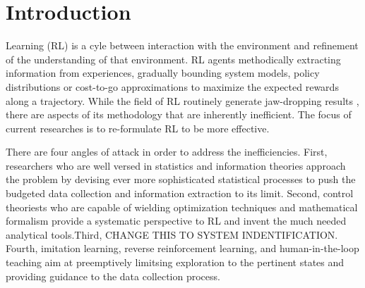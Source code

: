 \documentclass[journal]{IEEEtran}
\begin{document}
\section{Introduction}
 Learning (RL) is a cyle between interaction with the environment and refinement of the understanding of that environment. RL agents methodically extracting information from experiences, gradually bounding system models, policy distributions or cost-to-go approximations to maximize the expected rewards along a trajectory. While the field of RL routinely generate jaw-dropping results \cite{Mnih2013PlayingAW}\cite{Hausknecht2015DeepRQ}\cite{Andrychowicz2020LearningDI}\cite{Kalashnikov2018QTOptSD}\cite{Lee2020LearningQL}, there are aspects of its methodology that are inherently inefficient. The focus of current researches is to re-formulate RL to be more effective.

There are four angles of attack in order to address the inefficiencies. First, researchers who are well versed in statistics and information theories approach the problem by devising ever more sophisticated statistical processes to push the budgeted data collection and information extraction to its limit.\cite{Ho2016GenerativeAI}\cite{Finn2016UnsupervisedLF}\cite{Pathak2017CuriosityDrivenEB}\cite{Burda2019LargeScaleSO}\cite{Finn2017ModelAgnosticMF}\cite{Mishra2018ASN}\cite{Nachum2018DataEfficientHR}\cite{Vezhnevets2017FeUdalNF}\cite{Blundell2015WeightUI}\cite{Gal2017ConcreteD}\cite{Dasgupta2019CausalRF}\cite{Zhang2020DesigningOD} Second, control theoriests who are capable of wielding optimization techniques and mathematical formalism provide a systematic perspective to RL and invent the much needed analytical tools.\cite{Han2020ActorCriticRL}\cite{Weinan2017APO}\cite{Dupont2019AugmentedNO}\cite{Betancourt2018OnSO}\cite{Nachum2020ReinforcementLV}\cite{Luo2019ADR}\cite{Wu2020DataDrivenDL}\cite{Shi2019NeuralLS}Third, CHANGE THIS TO SYSTEM INDENTIFICATION. \cite{Hewing2020LearningBasedMP}\cite{Mohan2020EmbeddingHP}\cite{Lusch2018DeepLF}\cite{Bai2019DeepEM}\cite{BelbutePeres2020CombiningDP} Fourth, imitation learning, reverse reinforcement learning, and human-in-the-loop teaching aim at preemptively limitsing exploration to the pertinent states and providing guidance to the data collection process. \cite{Knox2009InteractivelySA}\cite{Knox2010CombiningMF}\cite{Peng2018DeepMimicED}\cite{Peng2020LearningAR}\cite{Paine2018OneShotHI}
\end{document}
